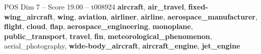 \begin{textsample}{POS Dim 7 – Score 19.00 – t008924}  \label{ex:f7_pos_022}
\textbf{aircraft}, \textbf{air\_travel}, \textbf{fixed-wing\_aircraft}, \textbf{wing}, \textbf{aviation}, \textbf{airliner}, \textbf{airline}, \textbf{aerospace\_manufacturer}, \textbf{flight}, \textbf{cloud}, \textbf{flap}, \textbf{aerospace\_engineering}, \textbf{monoplane}, \textbf{public\_transport}, \textbf{travel}, \textbf{fin}, \textbf{meteorological\_phenomenon}, aerial\_photography, \textbf{wide-body\_aircraft}, \textbf{aircraft\_engine}, \textbf{jet\_engine}

\end{textsample}
